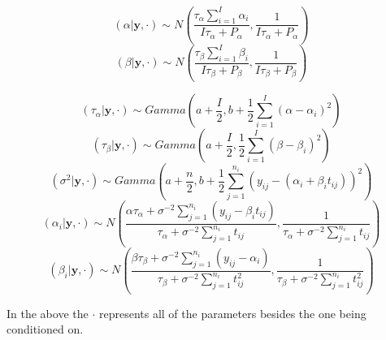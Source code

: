 \documentclass[]{article}
\begin{document}
\[(\alpha|\pmb{y}, \cdot) \sim N \left( \frac{\tau_\alpha \sum_{i=1}^I \alpha_i}{ I\tau_\alpha + P_\alpha }, \frac{1}{I\tau_\alpha + P_\alpha} \right) \]
\[(\beta| \pmb{y}, \cdot) \sim N \left(\frac{\tau_\beta \sum_{i=1}^I \beta_i}{ I\tau_\beta + P_\beta}, \frac{1}{I\tau_\beta + P_\beta} \right) \]

\[(\tau_\alpha|\pmb{y}, \cdot) \sim Gamma\left(a + \frac{I}{2}, b + \frac{1}{2}  \sum_{i=1}^I (\alpha - \alpha_i)^2 \right) \]
\[ (\tau_\beta|\pmb{y}, \cdot) \sim Gamma \left(a + \frac{I}{2}, \frac{1}{2} \sum_{i=1}^I (\beta-\beta_i)^2 \right) \]
\[(\sigma^2|\pmb{y}, \cdot) \sim Gamma \left(a + \frac{n}{2}, b + \frac{1}{2}  \sum_{j=1}^{n_i} (y_{ij} - (\alpha_i + \beta_i t_{ij} ))^2 \right) \]
\[(\alpha_i| \pmb{y}, \cdot) \sim N \left(\frac{\alpha \tau_\alpha + \sigma^{-2} \sum_{j=1}^{n_i} (y_{ij} - \beta_i t_{ij}) }{\tau_\alpha + \sigma^{-2} \sum_{j=1}^{n_i}t_{ij} }, \frac{1}{\tau_\alpha + \sigma^{-2} \sum_{j=1}^{n_i}t_{ij}} \right)\]
\[(\beta_i|\pmb{y},\cdot) \sim N\left( \frac{\beta \tau_\beta + \sigma^{-2}\sum_{j=1}^{n_i}(y_{ij} - \alpha_i ) }{\tau_\beta + \sigma^{-2} \sum_{j=1}^{n_i} t_{ij}^2 }, \frac{1}{\tau_\beta + \sigma^{-2} \sum_{j=1}^{n_i} t_{ij}^2} \right) \]

In the above the \(\cdot\) represents all of the parameters besides the
one being conditioned on.
\end{document}
